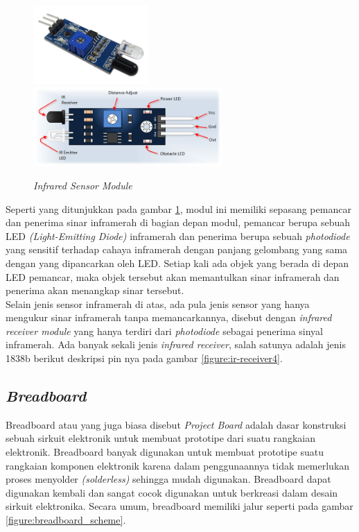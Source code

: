 \begin{figure}[H]
	\centerline {
		\includegraphics[height=3cm]{bab3/img/ir-sensor.png}
		\includegraphics[height=3cm]{bab3/img/ir-sensor-pin.png}
	}
	\caption{\textit{Infrared Sensor Module}}
	\label{figure:ir-sensor}
\end{figure}

Seperti yang ditunjukkan pada gambar \ref{figure:ir-sensor}, modul ini memiliki sepasang pemancar dan penerima sinar inframerah di bagian depan modul, pemancar berupa sebuah LED \textit{(Light-Emitting Diode)} inframerah dan penerima berupa sebuah \textit{photodiode} yang sensitif terhadap cahaya inframerah dengan panjang gelombang yang sama dengan yang dipancarkan oleh LED. Setiap kali ada objek yang berada di depan LED pemancar, maka objek tersebut akan memantulkan sinar inframerah dan penerima akan menangkap sinar tersebut. \\
\tab Selain jenis sensor inframerah di atas, ada pula jenis sensor yang hanya mengukur sinar inframerah tanpa memancarkannya, disebut dengan \textit{infrared receiver module} yang hanya terdiri dari \textit{photodiode} sebagai penerima sinyal inframerah. Ada banyak sekali jenis \textit{infrared receiver}, salah satunya adalah jenis 1838b berikut deskripsi pin nya pada gambar \ref{figure:ir-receiver4}.

\subsection{\textit{Breadboard}}
\tab Breadboard atau yang juga biasa disebut \textit{Project Board} adalah dasar konstruksi sebuah sirkuit elektronik untuk membuat prototipe dari suatu rangkaian elektronik. Breadboard banyak digunakan untuk membuat prototipe suatu rangkaian komponen elektronik karena dalam penggunaannya tidak memerlukan proses menyolder \textit{(solderless)} sehingga mudah digunakan. Breadboard dapat digunakan kembali dan sangat cocok digunakan untuk berkreasi dalam desain sirkuit elektronika. Secara umum, breadboard memiliki jalur seperti pada gambar \ref{figure:breadboard_scheme}.

